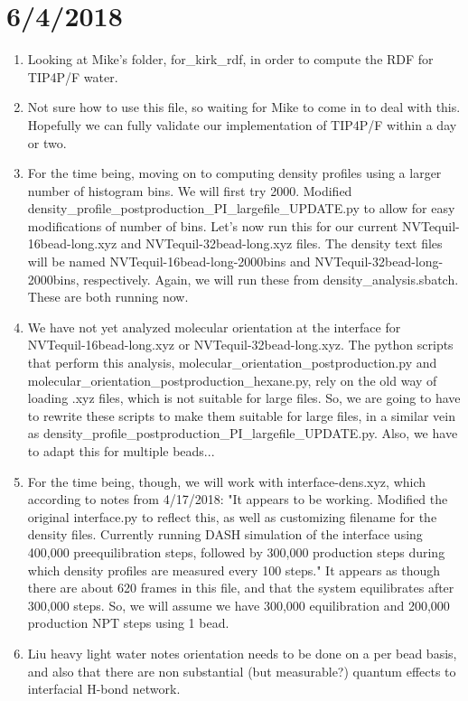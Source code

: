 \documentclass[12pt,reqno]{amsart}
\numberwithin{equation}{section}
\begin{document}
\section{6/4/2018}
\begin{enumerate}
\item Looking at Mike's folder, for\_kirk\_rdf, in order to compute the RDF for TIP4P/F water.  
\item Not sure how to use this file, so waiting for Mike to come in to deal with this.  Hopefully we can fully validate our implementation of TIP4P/F within a day or two.  
\item For the time being, moving on to computing density profiles using a larger number of histogram bins.  We will first try 2000.  Modified density\_profile\_postproduction\_PI\_largefile\_UPDATE.py to allow for easy modifications of number of bins.  Let's now run this for our current NVTequil-16bead-long.xyz and NVTequil-32bead-long.xyz files.  The density text files will be named NVTequil-16bead-long-2000bins and NVTequil-32bead-long-2000bins, respectively.  Again, we will run these from density\_analysis.sbatch.  These are both running now.  
\item We have not yet analyzed molecular orientation at the interface for NVTequil-16bead-long.xyz or NVTequil-32bead-long.xyz.  The python scripts that perform this analysis, molecular\_orientation\_postproduction.py and molecular\_orientation\_postproduction\_hexane.py, rely on the old way of loading .xyz files, which is not suitable for large files.  So, we are going to have to rewrite these scripts to make them suitable for large files, in a similar vein as density\_profile\_postproduction\_PI\_largefile\_UPDATE.py.  Also, we have to adapt this for multiple beads...
\item For the time being, though, we will work with interface-dens.xyz, which according to notes from 4/17/2018: "It appears to be working.  Modified the original interface.py to reflect this, as well as customizing filename for the density files.  Currently running DASH simulation of the interface using 400,000 preequilibration steps, followed by 300,000 production steps during which density profiles are measured every 100 steps."  It appears as though there are about 620 frames in this file, and that the system equilibrates after 300,000 steps.  So, we will assume we have 300,000 equilibration and 200,000 production NPT steps using 1 bead.  
\item Liu heavy light water notes orientation needs to be done on a per bead basis, and also that there are non substantial (but measurable?) quantum effects to interfacial H-bond network.

\end{enumerate}
\end{document}
